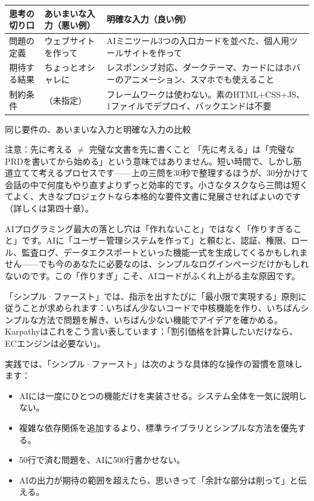 \begin{center}
\begin{tabularx}{\linewidth}{|X|X|X|}
\hline
\textbf{思考の切り口} & \textbf{あいまいな入力（悪い例）} & \textbf{明確な入力（良い例）} \tabularnewline
\hline
問題の定義 & ウェブサイトを作って & AIミニツール3つの入口カードを並べた、個人用ツールサイトを作って \tabularnewline
期待する結果 & ちょっとオシャレに & レスポンシブ対応、ダークテーマ、カードにはホバーのアニメーション、スマホでも使えること \tabularnewline
制約条件 & （未指定） & フレームワークは使わない。素のHTML+CSS+JS、1ファイルでデプロイ、バックエンドは不要 \tabularnewline
\hline
\end{tabularx}
\end{center}

\begin{center}\small\color{gray}同じ要件の、あいまいな入力と明確な入力の比較\end{center}

\begin{tcbwarn}{注意：先に考える $\neq$ 完璧な文書を先に書くこと}
「先に考える」は「完璧なPRDを書いてから始める」という意味ではありません。短い時間で、しかし筋道立てて考えるプロセスです——上の三問を30秒で整理するほうが、30分かけて会話の中で何度もやり直すよりずっと効率的です。小さなタスクなら三問は短くてよく、大きなプロジェクトなら本格的な要件文書に発展させればよいのです（詳しくは第四十章）。

\end{tcbwarn}


AIプログラミング最大の落とし穴は「作れないこと」ではなく「作りすぎること」です。AIに「ユーザー管理システムを作って」と頼むと、認証、権限、ロール、監査ログ、データエクスポートといった機能一式を生成してくるかもしれません——でも今のあなたに必要なのは、シンプルなログインページだけかもしれないのです。この「作りすぎ」こそ、AIコードがふくれ上がる主な原因です。

「シンプル·ファースト」では、指示を出すたびに「最小限で実現する」原則に従うことが求められます：いちばん少ないコードで中核機能を作り、いちばんシンプルな方法で問題を解き、いちばん少ない機能でアイデアを確かめる。Karpathyはこれをこう言い表しています：「割引価格を計算したいだけなら、ECエンジンは必要ない」。

実践では、「シンプル·ファースト」は次のような具体的な操作の習慣を意味します：

\begin{itemize}
  \item AIには一度にひとつの機能だけを実装させる。システム全体を一気に説明しない。
  \item 複雑な依存関係を追加するより、標準ライブラリとシンプルな方法を優先する。
  \item 50行で済む問題を、AIに500行書かせない。
  \item AIの出力が期待の範囲を超えたら、思いきって「余計な部分は削って」と伝える。
\end{itemize}

